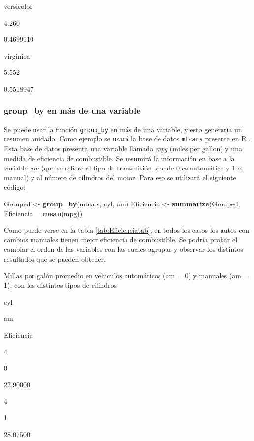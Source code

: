 \documentclass[]{book}
\newenvironment{Shaded}{\begin{snugshade}}{\end{snugshade}}
\newcommand{\DataTypeTok}[1]{\textcolor[rgb]{0.13,0.29,0.53}{#1}}
\newcommand{\KeywordTok}[1]{\textcolor[rgb]{0.13,0.29,0.53}{\textbf{#1}}}
\newcommand{\NormalTok}[1]{#1}
\newcommand{\StringTok}[1]{\textcolor[rgb]{0.31,0.60,0.02}{#1}}
\begin{document}
versicolor

4.260

0.4699110

virginica

5.552

0.5518947

\hypertarget{group_by-en-mas-de-una-variable}{%
\subsubsection{group\_by en más de una
variable}\label{group_by-en-mas-de-una-variable}}

Se puede usar la función \texttt{group\_by} en más de una variable, y
esto generaría un resumen anidado. Como ejemplo se usará la base de
datos \texttt{mtcars} presente en R \citep{henderson1981building}. Esta
base de datos presenta una variable llamada \emph{mpg} (miles per
gallon) y una medida de eficiencia de combustible. Se resumirá la
información en base a la variable \emph{am} (que se refiere al tipo de
transmisión, donde 0 es automático y 1 es manual) y al número de
cilindros del motor. Para eso se utilizará el siguiente código:

\begin{Shaded}
\begin{Highlighting}[]
\NormalTok{Grouped <-}\StringTok{ }\KeywordTok{group_by}\NormalTok{(mtcars, cyl, am)}
\NormalTok{Eficiencia <-}\StringTok{ }\KeywordTok{summarize}\NormalTok{(Grouped, }\DataTypeTok{Eficiencia =} \KeywordTok{mean}\NormalTok{(mpg))}
\end{Highlighting}
\end{Shaded}

Como puede verse en la tabla \ref{tab:Eficienciatab}, en todos los casos
los autos con cambios manuales tienen mejor eficiencia de combustible.
Se podría probar el cambiar el orden de las variables con las cuales
agrupar y observar los distintos resultados que se pueden obtener.

\label{tab:Eficienciatab}Millas por galón promedio en vehiculos automáticos
(am = 0) y manuales (am = 1), con los distintos tipos de cilindros

cyl

am

Eficiencia

4

0

22.90000

4

1

28.07500
\end{document}

